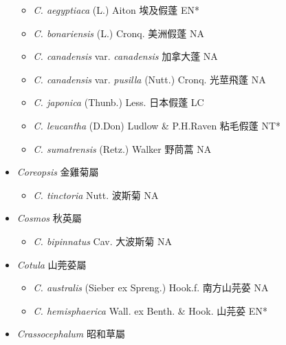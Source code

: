 \begin{itemize}
  \begin{itemize}
        \item[] \textit{C. aegyptiaca} (L.) Aiton  埃及假蓬   EN*
        \item[] \textit{C. bonariensis} (L.) Cronq.  美洲假蓬   NA
        \item[] \textit{C. canadensis} var. \textit{canadensis}   加拿大蓬   NA
        \item[] \textit{C. canadensis} var. \textit{pusilla} (Nutt.) Cronq.  光莖飛蓬   NA
        \item[] \textit{C. japonica} (Thunb.) Less.  日本假蓬   LC
        \item[] \textit{C. leucantha} (D.Don) Ludlow \& P.H.Raven  粘毛假蓬   NT*
        \item[] \textit{C. sumatrensis} (Retz.) Walker  野茼蒿   NA
  \end{itemize}
 \item[] \textit{Coreopsis} 金雞菊屬
                                
  \begin{itemize}
        \item[] \textit{C. tinctoria} Nutt.  波斯菊   NA
  \end{itemize}
 \item[] \textit{Cosmos} 秋英屬
                                
  \begin{itemize}
        \item[] \textit{C. bipinnatus} Cav.  大波斯菊   NA
  \end{itemize}
 \item[] \textit{Cotula} 山莞荽屬
                                
  \begin{itemize}
        \item[] \textit{C. australis} (Sieber ex Spreng.) Hook.f.  南方山芫荽   NA
        \item[] \textit{C. hemisphaerica} Wall. ex Benth. \& Hook.  山芫荽   EN*
  \end{itemize}
 \item[] \textit{Crassocephalum} 昭和草屬
                                

\end{itemize}
